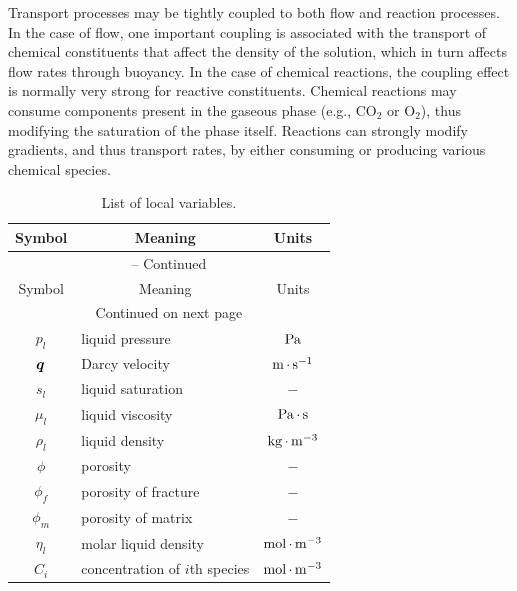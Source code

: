 Transport processes may be tightly coupled to both flow and reaction processes.  
In the case of flow, one important coupling is associated with the transport of chemical 
constituents that affect the density of the solution, which in turn affects flow rates through buoyancy.
In the case of chemical reactions, the coupling effect is normally very strong for reactive constituents.  
Chemical reactions may consume components present in the gaseous phase (e.g., CO$_2$ or O$_2$), thus 
modifying the saturation of the phase itself.  
Reactions can strongly modify gradients, and thus transport rates, by either consuming 
or producing various chemical species.

\begin{center}
\begin{longtable}{cp{7cm}c}
\caption{List of local variables.} \label{table:flow-list-of-variables} \\

\multicolumn{1}{c}{Symbol} & \multicolumn{1}{c}{Meaning} & \multicolumn{1}{c}{Units} \\
\hline  \hline 
\endfirsthead

\multicolumn{3}{c}{{\tablename} \thetable{} -- Continued} \\
\multicolumn{1}{c}{Symbol} & \multicolumn{1}{c}{Meaning} & \multicolumn{1}{c}{Units} \\
\hline  \hline 
\endhead

\hline \multicolumn{3}{c}{{Continued on next page}} \\ 
\hline \hline 
\endfoot

\hline \hline
\endlastfoot

$p_l$      & liquid pressure      &  ${\rm Pa}$ \\
${\boldsymbol{q}}$      & Darcy velocity       &  ${\rm m}{\,\cdot\,}{\rm s}^{-1}$  \\
$s_l$      & liquid saturation    &  $-$ \\
$\mu_l$    & liquid viscosity     &  ${\rm Pa}{\,\cdot\,}{\rm s}$ \\
$\rho_l$   & liquid density       &  ${\rm kg}{\,\cdot\,}{\rm m}^{-3}$ \\
$\phi$     & porosity             &  $-$  \\
$\phi_f$   & porosity of fracture &  $-$  \\
$\phi_m$   & porosity of matrix   &  $-$  \\
$\eta_l$   & molar liquid density &  ${\rm mol}{\,\cdot\,}{\rm m}^{-3}$ \\
$C_i$      & concentration of $i$th species    &  ${\rm mol}{\,\cdot\,}{\rm m}^{-3}$ \\


\end{longtable}
\end{center}


